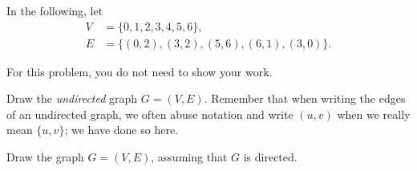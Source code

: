 \begin{prob}
    In the following, let
    \begin{align*}
        V &= \{0,1,2,3,4,5,6\},\\
        E &= \{
        (0,2), 
        (3,2), 
        (5,6), 
        (6,1), 
        (3,0) 
    \}.
    \end{align*}

    For this problem, you do not need to show your work.

    \begin{subprobset}
        \begin{subprob}
            Draw the \emph{undirected} graph $G = (V,E)$. Remember that when
            writing the edges of an undirected graph, we often abuse
            notation and write $(u,v)$ when we really mean $\{u,v\}$; we
            have done so here.

            \begin{soln}

                \begin{center}
                \end{center}

            \end{soln}
        \end{subprob}

        \begin{subprob}
            Draw the graph $G = (V,E)$, assuming that $G$ is directed.

            \begin{soln}

                \begin{center}
\end{center}
\end{soln}
\end{subprob}
\end{subprobset}
\end{prob}
